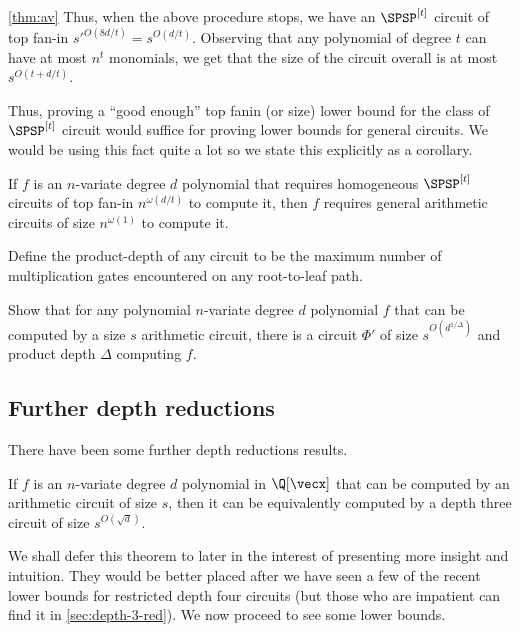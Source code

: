 \begin{proofof}{\autoref{thm:av}}
Thus, when the above procedure stops, we have an $\SPSP^{[t]}$ circuit of top fan-in $s'^{O(8d/t)} = s^{O(d/t)}$. 
Observing that any polynomial of degree $t$ can have at most $n^t$ monomials, we get that the size of the circuit overall is at most $s^{O(t + d/t)}$. 
\end{proofof}

Thus, proving a ``good enough'' top fanin (or size) lower bound for the class of $\SPSP^{[t]}$ circuit would suffice for proving lower bounds for general circuits. 
We would be using this fact quite a lot so we state this explicitly as a corollary. 

\begin{corollary}\label{cor:av}
If $f$ is an $n$-variate degree $d$ polynomial that requires homogeneous $\SPSP^{[t]}$ circuits of top fan-in $n^{\omega(d/t)}$ to compute it, then $f$ requires general arithmetic circuits of size $n^{\omega(1)}$ to compute it. 
\end{corollary}

\begin{exercise}
Define the product-depth of any circuit to be the maximum number of multiplication gates encountered on any root-to-leaf path. 

Show that for any polynomial $n$-variate degree $d$ polynomial $f$ that can be computed by a size $s$ arithmetic circuit, there is a circuit $\Phi'$ of size $s^{O(d^{1/\Delta})}$ and product depth $\Delta$ computing $f$. 
\end{exercise}

\subsection*{Further depth reductions}

There have been some further depth reductions results. 

\begin{theorem} If $f$ is an $n$-variate degree $d$ polynomial in $\Q[\vecx]$ that can be computed by an arithmetic circuit of size $s$, then it can be equivalently computed by a depth three circuit of size $s^{O(\sqrt{d})}$. 
\end{theorem}

We shall defer this theorem to later in the interest of presenting more insight and intuition. 
They would be better placed after we have seen a few of the recent lower bounds for restricted depth four circuits (but those who are impatient can find it in \autoref{sec:depth-3-red}). 
We now proceed to see some lower bounds. 




